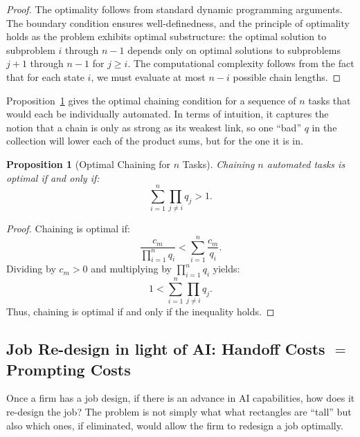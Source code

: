 \documentclass{article}
\theoremstyle{plain}
\theoremstyle{plain}
\newtheorem{proposition}[theorem]{Proposition}
\begin{document}
\begin{proof}
The optimality follows from standard dynamic programming arguments. The boundary condition ensures well-definedness, and the principle of optimality holds as the problem exhibits optimal substructure: the optimal solution to subproblem $i$ through $n-1$ depends only on optimal solutions to subproblems $j+1$ through $n-1$ for $j \geq i$. The computational complexity follows from the fact that for each state $i$, we must evaluate at most $n-i$ possible chain lengths.
\end{proof}

Proposition~\ref{prop:optimal_chaining} gives the optimal chaining condition for a sequence of $n$ tasks that would each be individually automated.
In terms of intuition, it captures the notion that a chain is only as strong as its weakest link, so one ``bad'' $q$ in the collection will lower each of the product sums, but for the one it is in. 

\begin{proposition}[Optimal Chaining for \(n\) Tasks] \label{prop:optimal_chaining}
  Chaining \(n\) automated tasks is optimal if and only if:
  \[
  \sum_{i=1}^n \prod_{j \neq i} q_j > 1.
  \]
  \end{proposition}
  
  \begin{proof}
  Chaining is optimal if:
  \[
  \frac{c_m}{\prod_{i=1}^n q_i} < \sum_{i=1}^n \frac{c_m}{q_i}.
  \]
  Dividing by \(c_m > 0\) and multiplying by \(\prod_{i=1}^n q_i\) yields:
  \[
  1 < \sum_{i=1}^n \prod_{j \neq i} q_j.
  \]
  Thus, chaining is optimal if and only if the inequality holds.
  \end{proof}

\subsection{Job Re-design in light of AI: Handoff Costs $=$ Prompting Costs}

Once a firm has a job design, if there is an advance in AI capabilities, how does it re-design the job?
The problem is not simply what what rectangles are ``tall'' but also which ones, if eliminated, would allow the firm to redesign a job optimally.
\end{document}
